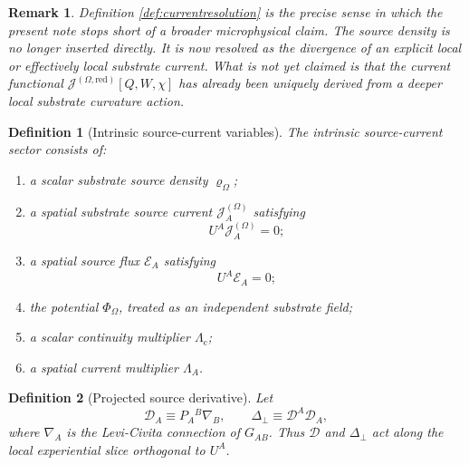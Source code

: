 \documentclass[11pt]{article}
\newcommand{\ProjSub}{P}
\newcommand{\SpatialD}{\mathcal D}
\newcommand{\LapPerp}{\Delta_\perp}
\newcommand{\FlowPot}{\Phi_\Omega}
\newcommand{\SourceDensity}{\varrho_\Omega}
\newcommand{\SourceCurrent}{\mathcal J^{(\Omega)}}
\newcommand{\SourceCurrentRed}{\mathcal J^{(\Omega,\mathrm{red})}}
\newcommand{\ContMult}{\Lambda_{\mathrm c}}
\newcommand{\CurrentMult}{\Lambda}
\newcommand{\SourceFlux}{\mathcal E}
\newtheorem{definition}{Definition}
\newtheorem{remark}{Remark}
\begin{document}
\begin{remark}
Definition \ref{def:currentresolution} is the precise sense in which the present note stops short of a broader microphysical claim. The source density is no longer inserted directly. It is now resolved as the divergence of an explicit local or effectively local substrate current. What is \emph{not} yet claimed is that the current functional \(\SourceCurrentRed[Q,W,\chi]\) has already been uniquely derived from a deeper local substrate curvature action.
\end{remark}

\begin{definition}[Intrinsic source-current variables]
\label{def:sourcevars}
The \emph{intrinsic source-current sector} consists of:
\begin{enumerate}
    \item a scalar substrate source density \(\SourceDensity\);
    \item a spatial substrate source current \(\SourceCurrent_A\) satisfying
    \begin{equation}
    U^A\SourceCurrent_A=0;
    \label{eq:spatialcurrent}
    \end{equation}
    \item a spatial source flux \(\SourceFlux_A\) satisfying
    \begin{equation}
    U^A\SourceFlux_A=0;
    \label{eq:spatialflux}
    \end{equation}
    \item the potential \(\FlowPot\), treated as an independent substrate field;
    \item a scalar continuity multiplier \(\ContMult\);
    \item a spatial current multiplier \(\CurrentMult_A\).
\end{enumerate}
\end{definition}

\begin{definition}[Projected source derivative]
\label{def:projected}
Let
\begin{equation}
\SpatialD_A\equiv \ProjSub_A{}^B\nabla_B,
\qquad
\LapPerp\equiv \SpatialD^A\SpatialD_A,
\label{eq:projderiv}
\end{equation}
where \(\nabla_A\) is the Levi-Civita connection of \(G_{AB}\). Thus \(\SpatialD\) and \(\LapPerp\) act along the local experiential slice orthogonal to \(U^A\).
\end{definition}
\end{document}
